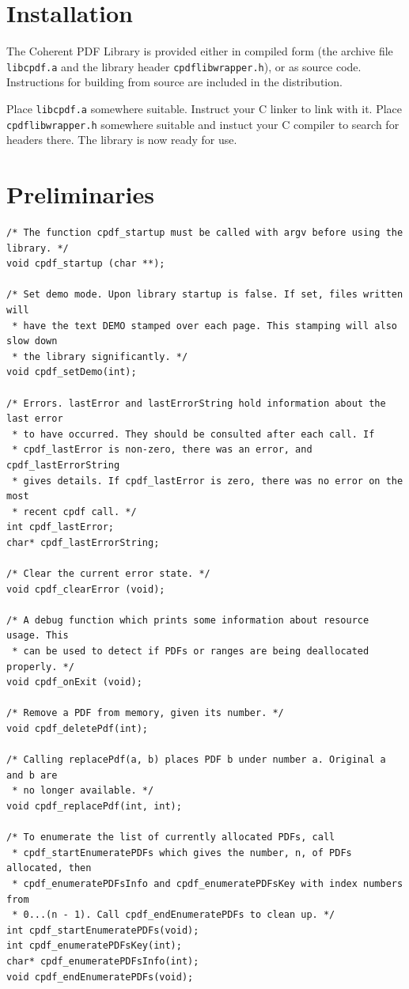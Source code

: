\documentclass[a4paper]{memoir}
\begin{document}
\chapter*{Installation}
The Coherent PDF Library is provided either in compiled form (the archive file \texttt{libcpdf.a} and the library header \texttt{cpdflibwrapper.h}), or as source code. Instructions for building from source are included in the distribution.

Place \texttt{libcpdf.a} somewhere suitable. Instruct your C linker to link with it. Place \texttt{cpdflibwrapper.h} somewhere suitable and instuct your C compiler to search for headers there. \noindent The library is now ready for use.

\setcounter{chapter}{-1}
\chapter{Preliminaries}

\begin{small}
\begin{lstlisting}
/* The function cpdf_startup must be called with argv before using the
library. */
void cpdf_startup (char **);

/* Set demo mode. Upon library startup is false. If set, files written will
 * have the text DEMO stamped over each page. This stamping will also slow down
 * the library significantly. */
void cpdf_setDemo(int);

/* Errors. lastError and lastErrorString hold information about the last error
 * to have occurred. They should be consulted after each call. If
 * cpdf_lastError is non-zero, there was an error, and cpdf_lastErrorString
 * gives details. If cpdf_lastError is zero, there was no error on the most
 * recent cpdf call. */
int cpdf_lastError;
char* cpdf_lastErrorString;

/* Clear the current error state. */
void cpdf_clearError (void);

/* A debug function which prints some information about resource usage. This
 * can be used to detect if PDFs or ranges are being deallocated properly. */
void cpdf_onExit (void);

/* Remove a PDF from memory, given its number. */
void cpdf_deletePdf(int);

/* Calling replacePdf(a, b) places PDF b under number a. Original a and b are
 * no longer available. */
void cpdf_replacePdf(int, int);

/* To enumerate the list of currently allocated PDFs, call
 * cpdf_startEnumeratePDFs which gives the number, n, of PDFs allocated, then
 * cpdf_enumeratePDFsInfo and cpdf_enumeratePDFsKey with index numbers from
 * 0...(n - 1). Call cpdf_endEnumeratePDFs to clean up. */
int cpdf_startEnumeratePDFs(void);
int cpdf_enumeratePDFsKey(int);
char* cpdf_enumeratePDFsInfo(int);
void cpdf_endEnumeratePDFs(void);

\end{lstlisting}
\end{small}
\end{document}
